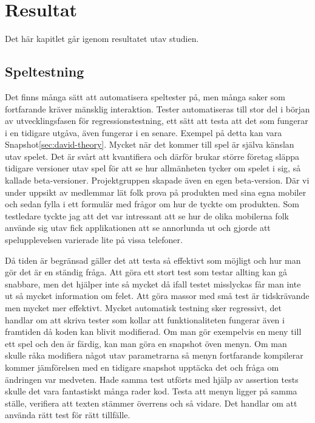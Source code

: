 \section{Resultat}
\label{sec:david-results}
Det här kapitlet går igenom resultatet utav studien.

\subsection{Speltestning}
Det finns många sätt att automatisera speltester på, men många saker som fortfarande kräver mänsklig interaktion. Tester automatiseras till stor del i början av utvecklingsfasen för regressionstestning, ett sätt att testa att det som fungerar i en tidigare utgåva, även fungerar i en senare. Exempel på detta kan vara Snapshot\ref{sec:david-theory}. Mycket när det kommer till spel är själva känslan utav spelet. Det är svårt att kvantifiera och därför brukar större företag släppa tidigare versioner utav spel för att se hur allmänheten tycker om spelet i sig, så kallade beta-versioner. Projektgruppen skapade även en egen beta-version. Där vi under uppsikt av medlemmar lät folk prova på produkten med sina egna mobiler och sedan fylla i ett formulär med frågor om hur de tyckte om produkten. Som testledare tyckte jag att det var intressant att se hur de olika mobilerna folk använde sig utav fick applikationen att se annorlunda ut och gjorde att spelupplevelsen varierade lite på vissa telefoner.

Då tiden är begränsad gäller det att testa så effektivt som möjligt och hur man gör det är en ständig fråga. Att göra ett stort test som testar allting kan gå snabbare, men det hjälper inte så mycket då ifall testet misslyckas får man inte ut så mycket information om felet. Att göra massor med små test är tidskrävande men mycket mer effektivt. Mycket automatisk testning sker regressivt, det handlar om att skriva tester som kollar att funktionaliteten fungerar även i framtiden då koden kan blivit modifierad. Om man gör exempelvis en meny till ett spel och den är färdig, kan man göra en snapshot öven menyn. Om man skulle råka modifiera något utav parametrarna så menyn fortfarande kompilerar kommer jämförelsen med en tidigare snapshot upptäcka det och fråga om ändringen var medveten. Hade samma test utförts med hjälp av assertion tests skulle det vara fantastiskt många rader kod. Testa att menyn ligger på samma ställe, verifiera att texten stämmer överrens och så vidare. Det handlar om att använda rätt test för rätt tillfälle.

